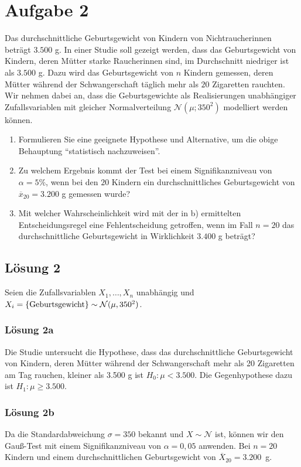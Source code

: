 \documentclass[main.tex]{subfiles}
\begin{document}
\section{Aufgabe 2}
Das durchschnittliche Geburtsgewicht von Kindern von Nichtraucherinnen beträgt $3.500$ g. In einer Studie soll gezeigt werden, dass das Geburtsgewicht von Kindern, deren Mütter starke Raucherinnen sind, im Durchschnitt niedriger ist als $3.500$ g. Dazu wird das Geburtsgewicht von $n$ Kindern gemessen, deren Mütter während der Schwangerschaft täglich mehr als $20$ Zigaretten rauchten. Wir nehmen dabei an, dass die Geburtsgewichte als Realisierungen unabhängiger Zufallsvariablen mit gleicher Normalverteilung $\mathcal{N}(\mu; 350^2)$ modelliert werden können.
\begin{enumerate}
\item Formulieren Sie eine geeignete Hypothese und Alternative, um die obige Behauptung "`statistisch nachzuweisen"'.
\item Zu welchem Ergebnis kommt der Test bei einem Signifikanzniveau von $\alpha = 5\%$, wenn bei den $20$ Kindern ein durchschnittliches Geburtsgewicht von $\overline{x}_{20} = 3.200$ g gemessen wurde?
\item Mit welcher Wahrscheinlichkeit wird mit der in b) ermittelten Entscheidungsregel eine Fehlentscheidung getroffen, wenn im Fall $n = 20$ das durchschnittliche Geburtsgewicht in Wirklichkeit $3.400$ g beträgt?
\end{enumerate}

\subsection{Lösung 2}
Seien die Zufallsvariablen $X_1, \dots, X_n$ unabhängig und $X_i = \{\text{Geburtsgewicht}\}\sim \mathcal{N}(\mu, 350^2)$.\\

\subsubsection{Lösung 2a}
Die Studie untersucht die Hypothese, dass das durchschnittliche Geburtsgewicht von Kindern, deren Mütter während der Schwangerschaft mehr als 20 Zigaretten am Tag rauchen, kleiner als 3.500 g ist $H_0: \mu < 3.500$. Die Gegenhypothese dazu ist $H_1: \mu \geq 3.500$.

\subsubsection{Lösung 2b}
Da die Standardabweichung $\sigma = 350$ bekannt und $X\sim\mathcal{N}$ ist, können wir den Gauß-Test mit einem Signifikanzniveau von $\alpha = 0,05$ anwenden. 
Bei $n=20$ Kindern und einem durchschnittlichen Geburtsgewicht von $\overline{X}_{20} = 3.200$~g. 
\end{document}
